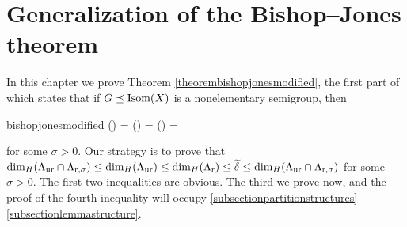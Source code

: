 
\chapter{Generalization of the Bishop--Jones theorem}
\label{sectionbishopjones}

In this chapter we prove Theorem \ref{theorembishopjonesmodified}, the first part of which states that if $G\preceq\operatorname{Isom}(X)$ is a nonelementary semigroup, then
\begin{repequation}{bishopjonesmodified}
\HD(\Lr) = \HD(\Lur) = \HD(\Lur\cap\Lrsigma) = \w\delta
\end{repequation}
for some $\sigma > 0$. Our strategy is to prove that ${\dim_H}(\Lambda_{\mathrm{ur}}\cap\Lambda_{\mathrm r,\sigma})\leq {\dim_H}(\Lambda_{\mathrm{ur}}) \leq {\dim_H}(\Lambda_{\mathrm r}) \leq \widetilde\delta \leq {\dim_H}(\Lambda_{\mathrm{ur}}\cap\Lambda_{\mathrm r,\sigma})$ for some $\sigma > 0$. The first two inequalities are obvious. The third we prove now, and the proof of the fourth inequality will occupy \6\6\ref{subsectionpartitionstructures}-\ref{subsectionlemmastructure}.

